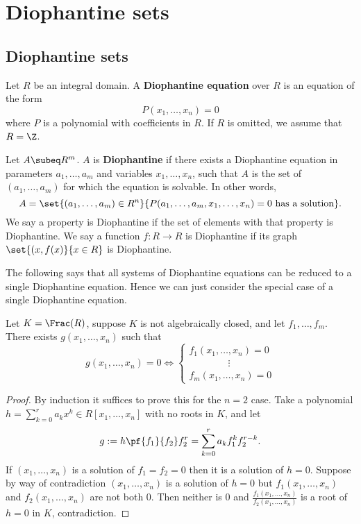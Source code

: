 \chapter{Diophantine sets}
\section{Diophantine sets}
\begin{df}
Let $R$ be an integral domain. A \textbf{Diophantine equation} over $R$ is an equation of the form
\[
P(x_1,\ldots, x_n)=0
\]
where $P$ is a polynomial with coefficients in $R$. If $R$ is omitted, we assume that $R=\Z$.
\end{df}
\begin{df}
Let $A\subeq R^m$. 
$A$ is \textbf{Diophantine} if there exists a Diophantine equation in parameters $a_1,\ldots, a_m$ and variables $x_1,\ldots, x_n$, such that $A$ is the set of $(a_1,\ldots, a_m)$ for which the equation is solvable. In other words,
\[
A=\set{(a_1,\ldots, a_m)\in R^n}{P(a_1,\ldots, a_m,x_1,\ldots, x_n)=0\text{ has a solution}}.
\]
We say a property is Diophantine if the set of elements with that property is Diophantine. We say a function $f:R\to R$ is Diophantine if its graph $\set{(x,f(x)}{x\in R}$ is Diophantine.
\end{df}
The following says that all systems of Diophantine equations can be reduced to a single Diophantine equation. Hence we can just consider the special case of a single Diophantine equation.
\begin{pr}
Let $K=\Frac(R)$, suppose $K$ is not algebraically closed, and let $f_1,\ldots, f_m$. 
There exists $g(x_1,\ldots, x_n)$ such that 
\[
g(x_1,\ldots, x_n)=0
\iff\begin{cases}
f_1(x_1,\ldots, x_n)=0\\
\qquad\qquad \vdots \\
f_m(x_1,\ldots, x_n)=0
\end{cases}
\]
\end{pr}
\begin{proof}
By induction it suffices to prove this for the $n=2$ case. 
Take a polynomial $h=\sum_{k=0}^r a_k x^k\in R[x_1,\ldots, x_n]$ with no roots in $K$, and let
\[
g:=h\pf{f_1}{f_2}f_2^r=\sum_{k=0}^r a_kf_1^kf_2^{r-k}.
\]
If $(x_1,\ldots, x_n)$ is a solution of $f_1=f_2=0$ then it is a solution of $h=0$. Suppose by way of contradiction $(x_1,\ldots, x_n)$ is a solution of $h=0$ but $f_1(x_1,\ldots, x_n)$ and $f_2(x_1,\ldots, x_n)$ are not both 0. Then neither is 0 and $\frac{f_1(x_1,\ldots, x_n)}{f_2(x_1,\ldots, x_n)}$ is a root of $h=0$ in $K$, contradiction. 
\end{proof}
